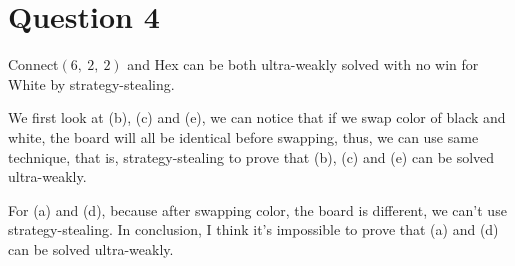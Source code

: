 \documentclass{article}[12pt]
\begin{document}
\section{Question 4}

Connect$(6, \ 2, \ 2)$ and Hex can be both ultra-weakly solved with no win for White by strategy-stealing. 

We first look at (b), (c) and (e), we can notice that if we swap color of black and white, the board will all be identical before swapping, thus, we can use same technique, that is, strategy-stealing to prove that (b), (c) and (e) can be solved ultra-weakly.

For (a) and (d), because after swapping color, the board is different, we can't use strategy-stealing. In conclusion, I think it's impossible to prove that (a) and (d) can be solved ultra-weakly.
\end{document}
